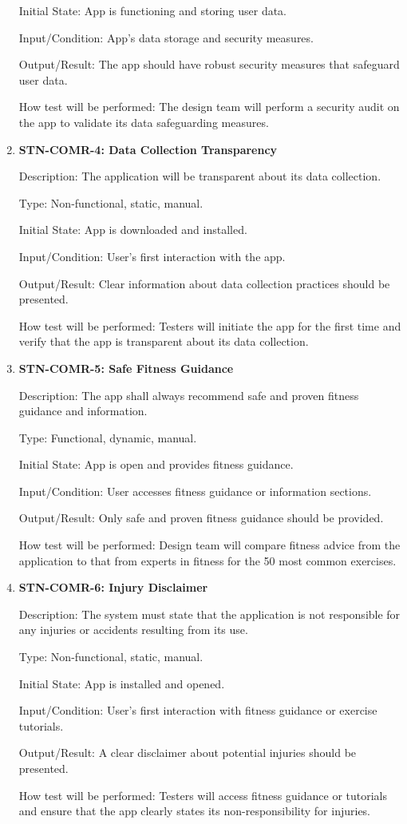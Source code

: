 \documentclass[12pt, titlepage]{article}
\begin{document}
\begin{enumerate}
Initial State: App is functioning and storing user data.

Input/Condition: App's data storage and security measures.

Output/Result: The app should have robust security measures that safeguard user data.

How test will be performed: The design team will perform a security audit on the app to validate its data safeguarding measures.

\item{\textbf{STN-COMR-4: Data Collection Transparency}}

Description: The application will be transparent about its data collection.

Type: Non-functional, static, manual.

Initial State: App is downloaded and installed.

Input/Condition: User's first interaction with the app.

Output/Result: Clear information about data collection practices should be presented.

How test will be performed: Testers will initiate the app for the first time and verify that the app is transparent about its data collection.

\item{\textbf{STN-COMR-5: Safe Fitness Guidance}}

Description: The app shall always recommend safe and proven fitness guidance and information.

Type: Functional, dynamic, manual.

Initial State: App is open and provides fitness guidance.

Input/Condition: User accesses fitness guidance or information sections.

Output/Result: Only safe and proven fitness guidance should be provided.

How test will be performed: Design team will compare fitness advice from the application to that from experts in fitness for the 50 most common exercises. 


\item{\textbf{STN-COMR-6: Injury Disclaimer}}

Description: The system must state that the application is not responsible for any injuries or accidents resulting from its use.

Type: Non-functional, static, manual.

Initial State: App is installed and opened.

Input/Condition: User's first interaction with fitness guidance or exercise tutorials.

Output/Result: A clear disclaimer about potential injuries should be presented.

How test will be performed: Testers will access fitness guidance or tutorials and ensure that the app clearly states its non-responsibility for injuries.

\end{enumerate}
\end{document}

